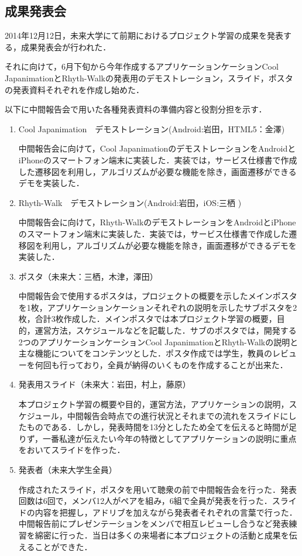\subsection{成果発表会}
\par
2014年12月12日，未来大学にて前期におけるプロジェクト学習の成果を発表する，成果発表会が行われた．
\par
それに向けて，6月下旬から今年作成するアプリケーションケーションCool JapanimationとRhyth-Walkの発表用のデモストレーション，スライド，ポスタの発表資料それぞれを作成し始めた．
\par
以下に中間報告会で用いた各種発表資料の準備内容と役割分担を示す．
\begin{enumerate}
\item
Cool Japanimation　デモストレーション(Android:岩田，HTML5：金澤)
\par 中間報告会に向けて，Cool JapanimationのデモストレーションをAndroidとiPhoneのスマートフォン端末に実装した．実装では，サービス仕様書で作成した遷移図を利用し，アルゴリズムが必要な機能を除き，画面遷移ができるデモを実装した．
\item Rhyth-Walk　デモストレーション(Android:岩田，iOS:三栖 )
\par
中間報告会に向けて，Rhyth-WalkのデモストレーションをAndroidとiPhoneのスマートフォン端末に実装した．実装では，サービス仕様書で作成した遷移図を利用し，アルゴリズムが必要な機能を除き，画面遷移ができるデモを実装した．
\item ポスタ（未来大：三栖，木津，澤田）
\par
中間報告会で使用するポスタは，プロジェクトの概要を示したメインポスタを1枚，アプリケーションケーションそれぞれの説明を示したサブポスタを2枚，合計3枚作成した．メインポスタでは本プロジェクト学習の概要，目的，運営方法，スケジュールなどを記載した．サブのポスタでは，開発する2つのアプリケーションケーションCool JapanimationとRhyth-Walkの説明と主な機能についてをコンテンツとした．ポスタ作成では学生，教員のレビューを何回も行っており，全員が納得のいくものを作成することが出来た．
\item 発表用スライド（未来大：岩田，村上，藤原）
\par
本プロジェクト学習の概要や目的，運営方法，アプリケーションの説明，スケジュール，中間報告会時点での進行状況とそれまでの流れをスライドにしたものである．しかし，発表時間を13分としたため全てを伝えると時間が足りず，一番私達が伝えたい今年の特徴としてアプリケーションの説明に重点をおいてスライドを作った．
\item 発表者（未来大学生全員）
\par
作成されたスライド，ポスタを用いて聴衆の前で中間報告会を行った．発表回数は6回で，メンバ12人がペアを組み，6組で全員が発表を行った．スライドの内容を把握し，アドリブを加えながら発表者それぞれの言葉で行った．中間報告前にプレゼンテーションをメンバで相互レビューし合うなど発表練習を綿密に行った．当日は多くの来場者に本プロジェクトの活動と成果を伝えることができた．

\end{enumerate}
